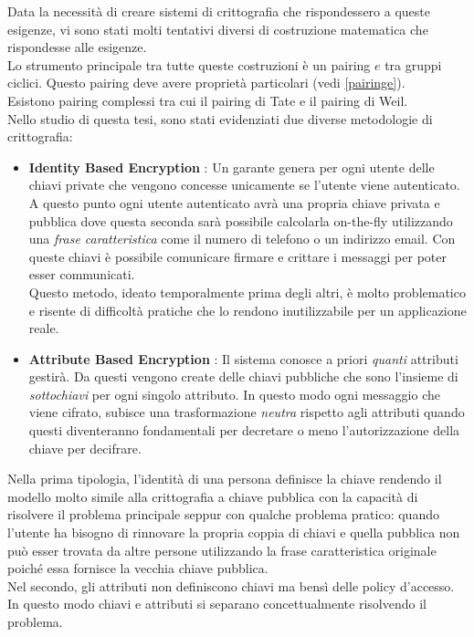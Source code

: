 Data la necessità di creare sistemi di crittografia che rispondessero a queste esigenze, vi sono stati molti tentativi diversi di costruzione matematica che rispondesse alle esigenze. \\
Lo strumento principale tra tutte queste costruzioni è un pairing $e$ tra gruppi ciclici. Questo pairing deve avere proprietà particolari (vedi \ref{pairinge}).\\
Esistono pairing complessi \cite{maas} \cite{benoit} tra cui il pairing di Tate e il pairing di Weil.\\[0.2cm]
Nello studio di questa tesi, sono stati evidenziati due diverse metodologie di crittografia:
\begin{itemize}
	\item \textbf{Identity Based Encryption} : Un garante genera per ogni utente delle chiavi private che vengono concesse unicamente se l'utente viene autenticato. A questo punto ogni utente autenticato avrà una propria chiave privata e pubblica dove questa seconda sarà possibile calcolarla on-the-fly utilizzando una \emph{frase caratteristica} come il numero di telefono o un indirizzo email. Con queste chiavi è possibile comunicare firmare e crittare i messaggi per poter esser communicati.\\
	Questo metodo, ideato temporalmente prima degli altri, è molto problematico e risente di difficoltà pratiche che lo rendono inutilizzabile per un applicazione reale.
	\item \textbf{Attribute Based Encryption} : Il sistema conosce a priori \emph{quanti} attributi gestirà. Da questi vengono create delle chiavi pubbliche che sono l'insieme di \emph{sottochiavi} per ogni singolo attributo. In questo modo ogni messaggio che viene cifrato, subisce una trasformazione \emph{neutra} rispetto agli attributi quando questi diventeranno fondamentali per decretare o meno l'autorizzazione della chiave per decifrare.
\end{itemize}

Nella prima tipologia, l'identità di una persona definisce la chiave rendendo il modello molto simile alla crittografia a chiave pubblica con la capacità di risolvere il problema principale seppur con qualche problema pratico: quando l'utente ha bisogno di rinnovare la propria coppia di chiavi e quella pubblica non può esser trovata da altre persone utilizzando la frase caratteristica originale poiché essa fornisce la vecchia chiave pubblica.\\
Nel secondo, gli attributi non definiscono chiavi ma bensì delle policy d'accesso. In questo modo chiavi e attributi si separano concettualmente risolvendo il problema.

